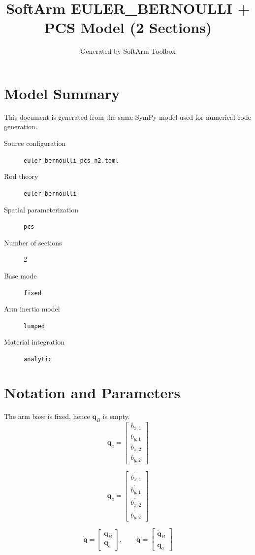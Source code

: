 \documentclass[11pt]{article}
\title{SoftArm EULER\_BERNOULLI + PCS Model (2 Sections)}
\author{Generated by SoftArm Toolbox}
\date{}
\begin{document}
\maketitle

\section{Model Summary}
This document is generated from the same SymPy model used for numerical code generation.
\begin{description}
\item[Source configuration] \texttt{euler\_bernoulli\_pcs\_n2.toml}
\item[Rod theory] \texttt{euler\_bernoulli}
\item[Spatial parameterization] \texttt{pcs}
\item[Number of sections] 2
\item[Base mode] \texttt{fixed}
\item[Arm inertia model] \texttt{lumped}
\item[Material integration] \texttt{analytic}
\end{description}

\section{Notation and Parameters}
The arm base is fixed, hence $\boldsymbol q_B$ is empty.
\begin{equation}
\boldsymbol q_a=\begin{bmatrix}b_{x,1}\\b_{y,1}\\b_{x,2}\\b_{y,2}\end{bmatrix}
\end{equation}

\begin{equation}
\dot{\boldsymbol q}_a=\begin{bmatrix}\dot{b_{x,1}}\\\dot{b_{y,1}}\\\dot{b_{x,2}}\\\dot{b_{y,2}}\end{bmatrix}
\end{equation}

\begin{equation}
\boldsymbol q=\begin{bmatrix}\boldsymbol q_B\\\boldsymbol q_a\end{bmatrix},\qquad \dot{\boldsymbol q}=\begin{bmatrix}\dot{\boldsymbol q}_B\\\dot{\boldsymbol q}_a\end{bmatrix}
\end{equation}
\end{document}

